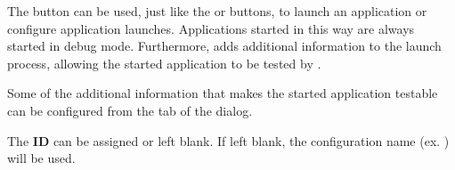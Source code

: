 The  button can be used, just like the  or 
 buttons, to launch an application or configure application 
launches. Applications started in this way are always started in debug mode.
Furthermore,  adds additional information to the 
launch process, allowing the started application to be tested by \app{}.

Some of the additional information that makes the started application testable 
can be configured from the  tab of the 
 dialog.

The \textbf{\gdaut{} ID} can be assigned or left blank. If left blank, the
configuration name (ex. ) will be used.